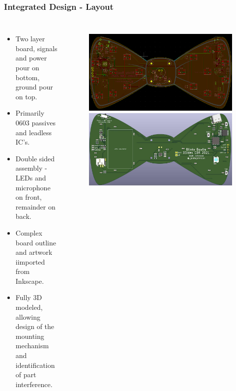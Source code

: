 \documentclass[aspectratio=169, t]{beamer}
\begin{document}
\begin{frame}
\frametitle{Integrated Design - Layout}
\vspace{-5mm}
\begin{columns}
	\begin{itemize}
		\item Two layer board, signals and power pour on bottom, ground pour on top.
		\item Primarily 0603 passives and leadless IC's.
		\item Double sided assembly - LEDs and microphone on front, remainder on back.
		\item Complex board outline and artwork iimported from Inkscape.
		\item Fully 3D modeled, allowing design of the mounting mechanism and identification of part interference.
	\end{itemize}
	\begin{figure}
		\includegraphics[width=0.9\linewidth]{images/bowtie-layout.png}
		\includegraphics[width=0.9\linewidth]{images/bowtie-render.jpg}
	\end{figure}
\end{columns}
\end{frame}
\end{document}
